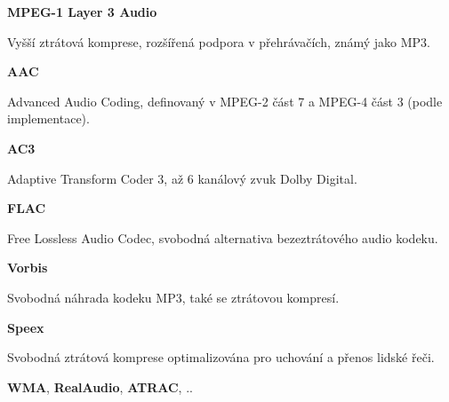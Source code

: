 \vspace{10pt}

\textbf{MPEG-1 Layer 3 Audio}

Vyšší ztrátová komprese, rozšířená podpora v přehrávačích, známý jako MP3.

\vspace{10pt}

\textbf{AAC}

Advanced Audio Coding, definovaný v MPEG-2 část 7 a MPEG-4 část 3 (podle implementace).

\vspace{10pt}

\textbf{AC3}

Adaptive Transform Coder 3, až 6 kanálový zvuk Dolby Digital.

\vspace{10pt}

\textbf{FLAC}

Free Lossless Audio Codec, svobodná alternativa bezeztrátového audio kodeku.

\vspace{10pt}

\textbf{Vorbis}

Svobodná náhrada kodeku MP3, také se ztrátovou kompresí.

\vspace{10pt}

\textbf{Speex}

Svobodná ztrátová komprese optimalizována pro uchování a přenos lidské řeči.

\vspace{10pt}

\textbf{WMA}, \textbf{RealAudio}, \textbf{ATRAC}, ..


